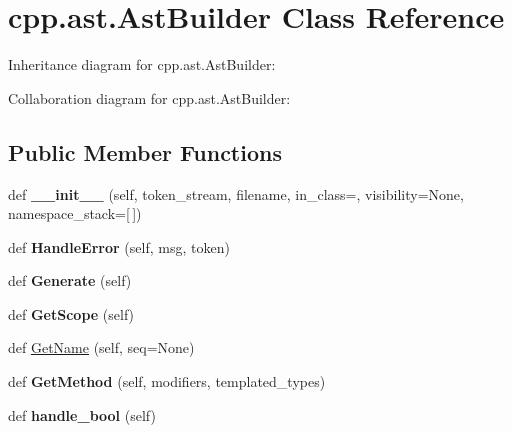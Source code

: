 \hypertarget{classcpp_1_1ast_1_1AstBuilder}{}\section{cpp.\+ast.\+Ast\+Builder Class Reference}
\label{classcpp_1_1ast_1_1AstBuilder}


Inheritance diagram for cpp.\+ast.\+Ast\+Builder\+:


Collaboration diagram for cpp.\+ast.\+Ast\+Builder\+:
\subsection*{Public Member Functions}
\begin{DoxyCompactItemize}
\item 
\mbox{\label{classcpp_1_1ast_1_1AstBuilder_aaf35e2f9d395c99a38e6bb6f9b5dd047}} 
def {\bfseries \+\_\+\+\_\+init\+\_\+\+\_\+} (self, token\+\_\+stream, filename, in\+\_\+class=\textquotesingle{}\textquotesingle{}, visibility=None, namespace\+\_\+stack=\mbox{[}$\,$\mbox{]})
\item 
\mbox{\label{classcpp_1_1ast_1_1AstBuilder_a3e610662018d674f6c57ef19254cc470}} 
def {\bfseries Handle\+Error} (self, msg, token)
\item 
\mbox{\label{classcpp_1_1ast_1_1AstBuilder_aebd0392eee56def849468af5b93b720a}} 
def {\bfseries Generate} (self)
\item 
\mbox{\label{classcpp_1_1ast_1_1AstBuilder_add6826421ce64546a7dbb9b2e699a4d4}} 
def {\bfseries Get\+Scope} (self)
\item 
def \hyperlink{classcpp_1_1ast_1_1AstBuilder_a327957c4228325fc5f64821b047bdc6f}{Get\+Name} (self, seq=None)
\item 
\mbox{\label{classcpp_1_1ast_1_1AstBuilder_af22fb880867876144d20818391ad267a}} 
def {\bfseries Get\+Method} (self, modifiers, templated\+\_\+types)
\item 
\mbox{\label{classcpp_1_1ast_1_1AstBuilder_ac5a5e19e5be6501d351891cc0ead5f53}} 
def {\bfseries handle\+\_\+bool} (self)

\end{DoxyCompactItemize}
